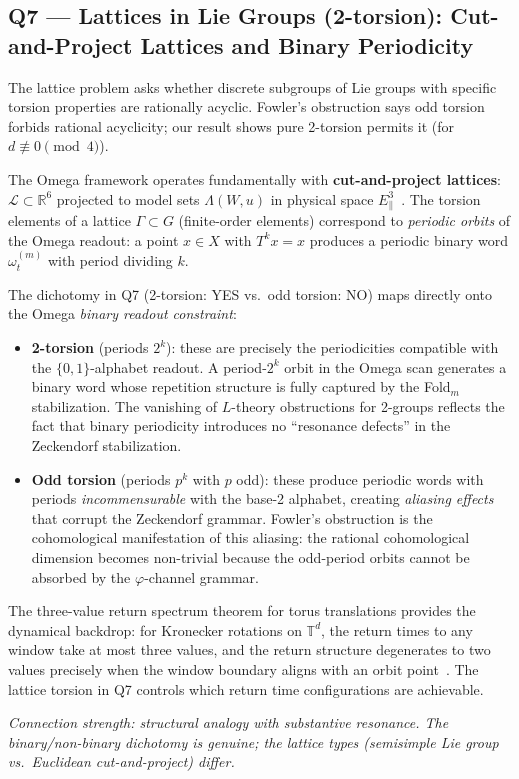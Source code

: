 \subsection{Q7 --- Lattices in Lie Groups (2-torsion):
  Cut-and-Project Lattices and Binary Periodicity}
\label{ss:omega-q7}

\begin{remark}
The lattice problem asks whether discrete subgroups of Lie groups
with specific torsion properties are rationally acyclic.
Fowler's obstruction says odd torsion forbids rational acyclicity;
our result shows pure 2-torsion permits it (for $d\not\equiv 0\pmod4$).

The Omega framework operates fundamentally with
\textbf{cut-and-project lattices}: $\mathcal L\subset\mathbb R^6$
projected to model sets $\Lambda(W,u)$ in physical space
$E_\parallel^3$~\cite{omega-grg}.
The torsion elements of a lattice $\Gamma\subset G$ (finite-order
elements) correspond to \emph{periodic orbits} of the Omega readout:
a point $x\in X$ with $T^kx=x$ produces a periodic binary word
$\omega^{(m)}_t$ with period dividing $k$.

The dichotomy in Q7 (2-torsion: YES vs.\ odd torsion: NO) maps
directly onto the Omega \emph{binary readout constraint}:
\begin{itemize}[nosep]
\item \textbf{2-torsion} (periods $2^k$):
  these are precisely the periodicities compatible with the
  $\{0,1\}$-alphabet readout.  A period-$2^k$ orbit in the
  Omega scan generates a binary word whose repetition
  structure is fully captured by the Fold$_m$ stabilization.
  The vanishing of $L$-theory obstructions for 2-groups
  reflects the fact that binary periodicity introduces no
  ``resonance defects'' in the Zeckendorf stabilization.
\item \textbf{Odd torsion} (periods $p^k$ with $p$ odd):
  these produce periodic words with periods \emph{incommensurable}
  with the base-2 alphabet, creating
  \emph{aliasing effects} that corrupt the Zeckendorf grammar.
  Fowler's obstruction is the cohomological manifestation of
  this aliasing: the rational cohomological dimension becomes
  non-trivial because the odd-period orbits cannot be absorbed
  by the $\varphi$-channel grammar.
\end{itemize}

The three-value return spectrum theorem for torus translations
provides the dynamical backdrop: for Kronecker rotations on $\mathbb T^d$,
the return times to any window take at most three values,
and the return structure degenerates to two values precisely when
the window boundary aligns with an orbit point~\cite{omega-grg}.
The lattice torsion in Q7 controls which return time configurations
are achievable.

\emph{Connection strength: structural analogy with substantive
resonance.  The binary/non-binary dichotomy is genuine; the lattice
types (semisimple Lie group vs.\ Euclidean cut-and-project) differ.}
\end{remark}



